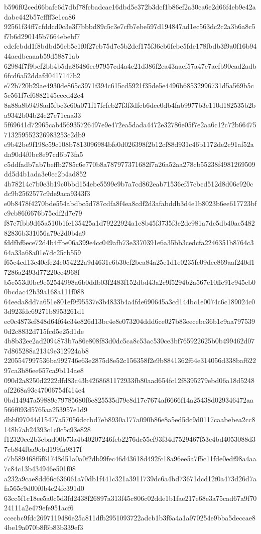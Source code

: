 {b596f02ced66bafc6d7dbf78fcbadcae16dbd5e372b3dcf1b86ef2a30ca6e2d66f4eb9e42adabc442b57effff3e1ca86
92561f34ff7cfddcd0c3e3f7bbbd89c5c3e7cfb7ebe597d194847ad1ec563dc2c2a3b6a8c5f7b6d290145b7664ebebf7
cdefebdd1f8bdbd56eb5c1f0f27eb75d7c5b2def175f36cb6febe5fde178fbdb3f9a0f16b9444acdbcaaab59d58871ab
62984f7f9bef2bb4b5da86486ec97957cd4a4e21d386f2ea43aacf57a47e7acfb90cad2adb6fcd6a52ddafd0417147b2
e72b720b29ae4930de865c3971f394c615cd5921f35de5e4496b68532996731d5a569b5c5e561f7cf6882145cecd42c4
8a88a8b9498ad5fbc3c60a071f17fcfcb27f3f3dfcb6dce0db4fab9977b3e110d182535b2ba9342b04b24e27e71caa33
5f69641d72965cab456935726497e9e472ea5dada4472e32786e05f7e2aa6c12c72b66475713259552326983253c2db9
e9b42be9f198c59c108b7813096984bfe0d026398f2b12cf88d931c46b1172de2c91af52ada90d4f0bc8e97cd6b73fa5
c5ddfadb7ab7beffb2785c6e770b8a787977371682f7a26a52aa278cb55238f4981269509dd5d4b1ada3e0ec2b4ad852
4b78214c7b0e3b19c0bbd154ebe5599e9b7a7cd862eab71536ef57cbcd512d8d06c920cdc9b2562577c9de9aca9343f3
e0b8478f4270bde554abdbc5d787cdfa8f4ea8cdf2d3afabddb3d4e1b8023b6ee617723bfc9cb86f6676b75cdf2d7e79
f87e7fbb9d65a510b1fe135425a1d79222924a1e8b45f3735f3e2de981a7dc5db40ac548282836b331056a79e2d0b4a9
fddfbf6ece72d4b4ffbe06a399e4cc049afb73e3370391e6a35bb3cedcfa2246351b8764c364a33a68a01e7dc25cb559
f65c4cd13c40cfe24e054222a9d4631e6b30ef2bea84a25e1d1e0235fc09dec869aaf240d17286a2493d77220ce4968f
b5e553d0bc9e52544998a6b0ddb03f2483f152dbd43a2c9f5294b2a567c10ffe91c945cb00bcdac42b39a168a111f088
64eeda8dd7a651e801ef9f95537e3b4833b4a4fde690645a3cd144bc1e0074c6c189024c03d923fdc69271b8953261d1
ec0c4873ef848d64f64c34e826d13bc4e8e073204ddd6ce027b83eecebc36b1c9aa7975390d2c8832d715fcd5e25d1de
4b8b32ee2ad2094873b7a86e808f83d0dc5ca8c53ac530ce3bf765922625b0b499462d077d865288a21349e312924ab8
2205547997536ba992746e63e2875d8e52c156358f2e9b8841362f64e314056d338baf62297ca3b86ee657ca9b114ae8
090d2a8250d2222dfd83c43b4268681172933fb80aad654fc12f8395279ebd06a18d5248af2268a93c47006754f414e4
0bd14947a59889c79785680f6c825535d79c8d17e7674af6666f14a25438d029346472aa566f093d5765aa253957e1d9
dbb097044d15477a57056dccbd7eb8930a177a090b86e8a5ed5dc9d0117caabebea2cc8148b7ab24393c1c0c5c93e828
f12320ce2b3cbad00b73a4b40207246feb2276dc55ef93f34d7529467f53c4bd4053088d37cb844fba9cbd199fa9817f
c7b589468f5f61748d51a0a0f2db99fec46d43618d492fc18a96ee5a7f5c11fde0edf98a4aa7c84c13b434946e501f08
a232a9cae8dd66c636061a70db1f441c321a3911739dc6a4bd73671dcd12f0a473d26d7afa565c9d00f0b4c24fc391d0
63cc5f1c18ee5a0c5d3fd2438f26897a313f45c806c02dde1b1fae217e68e3a75cad67a9f7024111a2e479efe951acf6
ccecbc9fdc2697119486e25a811dfb2951093722adcb1b3f6a4a1a970254e9bba5deccae84be19a070b8f6b83b339ef3
}
